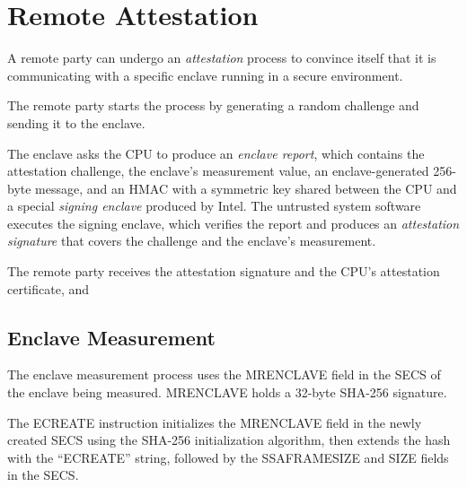 \section{Remote Attestation}
\label{sec:attestation}

A remote party can undergo an \textit{attestation} process to convince itself
that it is communicating with a specific enclave running in a secure
environment.


The remote party starts the process by generating a random
challenge and sending it to the enclave.

The enclave asks the CPU to produce an \textit{enclave report}, which contains
the attestation challenge, the enclave's measurement value, an
enclave-generated 256-byte message, and an HMAC
 with a symmetric key shared between the CPU and a special
\textit{signing enclave} produced by Intel. The untrusted system software
executes the signing enclave, which verifies the report and produces an
\textit{attestation signature} that covers the challenge and the enclave's
measurement.

The remote party receives the attestation signature and the CPU's attestation
certificate, and

\subsection{Enclave Measurement}
\label{sec:measurement}


The enclave measurement process uses the MRENCLAVE field in the SECS of the
enclave being measured. MRENCLAVE holds a 32-byte SHA-256 signature.


The ECREATE instruction initializes the MRENCLAVE field in the newly created
SECS using the SHA-256 initialization algorithm, then extends the hash with
the ``ECREATE'' string, followed by the SSAFRAMESIZE and SIZE fields in the
SECS.

\begin{table}[hbt]
  \caption{
    Data extended into MRENCLAVE by the ECREATE instruction.
  }
  \label{fig:ecreate_mrenclave}
\end{table}

